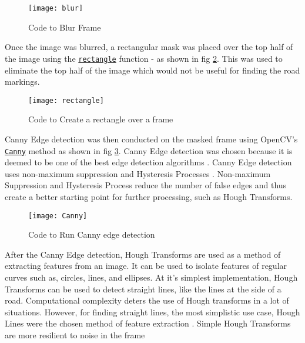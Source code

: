 \documentclass[conference]{IEEEtran}
\begin{document}
\begin{figure}[H]
\centerline{\texttt{[image: blur]}}
\caption{Code to Blur Frame}
\label{fig:blur}
\end{figure} 

Once the image was blurred, a rectangular mask was placed over the top half of the image using the \href{https://docs.opencv.org/4.x/d6/d6e/group__imgproc__draw.html#ga07d2f74cadcf8e305e810ce8eed13bc9}{\texttt{rectangle}} function - as shown in fig \ref{fig:rectangle}. This was used to eliminate the top half of the image which would not be useful for finding the road markings. 

\begin{figure}[H]
\centerline{\texttt{[image: rectangle]}}
\caption{Code to Create a rectangle over a frame}
\label{fig:rectangle}
\end{figure}
 
Canny Edge detection was then conducted on the masked frame using OpenCV's \href{https://docs.opencv.org/4.x/dd/d1a/group__imgproc__feature.html#ga04723e007ed888ddf11d9ba04e2232de}{\texttt{Canny}} method as shown in fig \ref{fig:Canny}. Canny Edge detection was chosen because it is deemed to be one of the best edge detection algorithms \cite{Canny2009CannyED}. Canny Edge detection uses non-maximum suppression \cite{non-maximum_supression} and Hysteresis Processes \cite{Hysteresis_Thresholding}. Non-maximum Suppression and Hysteresis Process reduce the number of false edges and thus create a better starting point for further processing, such as Hough Transforms. 

\begin{figure}[H]
\centerline{\texttt{[image: Canny]}}
\caption{Code to Run Canny edge detection}
\label{fig:Canny}
\end{figure}

After the Canny Edge detection, Hough Transforms are used as a method of extracting features from an image. It can be used to isolate features of regular curves such as, circles, lines, and ellipses. At it's simplest implementation, Hough Transforms can be used to detect straight lines, like the lines at the side of a road. Computational complexity deters the use of Hough transforms in a lot of situations. However, for finding straight lines, the most simplistic use case, Hough Lines were the chosen method of feature extraction \cite{Hough_Transform}. Simple Hough Transforms are more resilient to noise in the frame \cite{Hough_Lines_Better_Against_Noise}
\end{document}
